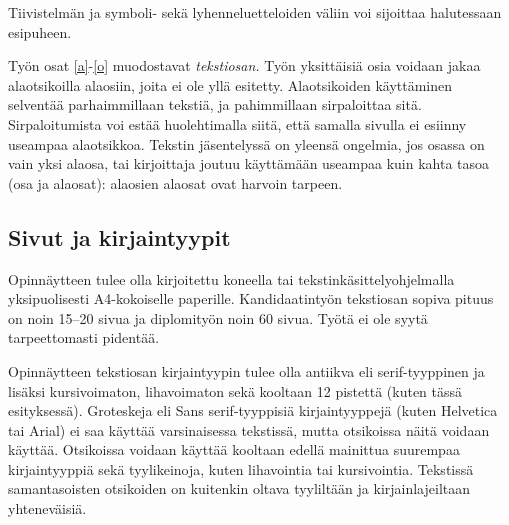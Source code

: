 \documentclass[english,12pt,a4paper,pdftex,elec,utf8]{aaltothesis}
\begin{document}
Tiivistelm\"an ja symboli- sek\"a lyhenneluetteloiden
v\"aliin voi sijoittaa halutessaan esipuheen.

Ty\"on osat \ref{a}-\ref{o} muodostavat \textit{tekstiosan.}  Ty\"on
yksitt\"aisi\"a osia voidaan jakaa alaotsikoilla alaosiin, joita ei ole
yll\"a esitetty. Alaotsikoiden k\"aytt\"aminen selvent\"a\"a parhaimmillaan
teksti\"a, ja pahimmillaan sirpaloittaa sit\"a.  Sirpaloitumista voi est\"a\"a
huolehtimalla siit\"a, ett\"a samalla sivulla ei esiinny useampaa
alaotsikkoa.  Tekstin j\"asentelyss\"a on yleens\"a ongelmia, jos osassa on
vain yksi alaosa, tai kirjoittaja joutuu k\"aytt\"am\"a\"an useampaa kuin
kahta tasoa (osa ja alaosat): alaosien alaosat ovat harvoin tarpeen.
\subsection*{Sivut ja kirjaintyypit}

Opinn\"aytteen tulee olla kirjoitettu koneella tai
tekstink\"asittelyohjelmalla yksipuolisesti A4-kokoiselle paperille.
Kandidaatinty\"on tekstiosan sopiva pituus on noin 15--20 sivua ja
diplomity\"on noin 60 sivua. Ty\"ot\"a ei ole syyt\"a tarpeettomasti pident\"a\"a.

Opinn\"aytteen tekstiosan kirjaintyypin tulee olla antiikva eli
serif\--tyyp\-pi\-nen ja lis\"aksi kursivoimaton, lihavoimaton sek\"a kooltaan 12
pistett\"a (kuten t\"ass\"a esityksess\"a). Groteskeja eli \textsf{Sans
  serif}-tyyppisi\"a kirjaintyyppej\"a (kuten Helvetica tai Arial) ei saa
k\"aytt\"a\"a varsinaisessa tekstiss\"a, mutta otsikoissa n\"ait\"a voidaan
k\"aytt\"a\"a.  Otsikoissa voidaan k\"aytt\"a\"a kooltaan edell\"a mainittua
suurempaa kirjaintyyppi\"a sek\"a tyylikeinoja, kuten lihavointia tai
kursivointia.  Tekstiss\"a samantasoisten otsikoiden on kuitenkin oltava
tyylilt\"a\"an ja kirjainlajeiltaan yhtenev\"aisi\"a.
\begin{table}[htb]
\caption{Taulukoissa ja kuvissa kirjaintyypin voi valita
tarkoituksenmukaisesti, mutta kuva- ja taulukkoteksteiss\"a tulee
k\"aytt\"a\"a samaa kirjaintyyppi\"a kuin varsinaisessa tekstiss\"a.
Huomaa taulukon numeroinnin sijoittuminen taulukon yl\"apuolelle. \label{taulukko1}}
\begin{center}
\end{center}
\end{table}
\end{document}
